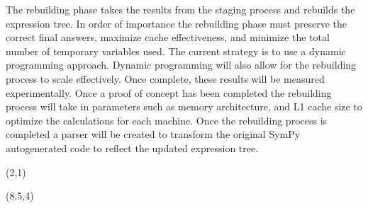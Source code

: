 \documentclass[landscape]{a0poster}
\def\Subhead#1{\noindent{\textbf{\Large\color{DarkBlue} #1}}\medskip}
\begin{document}
\begin{textblock}{30}
\begin{textblock}{14}
	\vspace{-0.25in}
	The rebuilding phase takes the results from the staging process and rebuilds the expression tree. In order of importance the rebuilding phase must preserve the correct final answers, maximize cache effectiveness, and minimize the total number of temporary variables used. The current strategy is to use a dynamic programming approach. Dynamic programming will also allow for the rebuilding process to scale effectively. Once complete, these results will be measured experimentally. Once a proof of concept has been completed the rebuilding process will take in parameters such as memory architecture, and L1 cache size to optimize the calculations for each machine. Once the rebuilding process is completed a parser will be created to transform the original SymPy autogenerated code to reflect the updated expression tree.
	\begin{textblock}{12}(2,1)
	\end{textblock}	
\end{textblock}
	

\begin{textblock}{8}(8.5,4)

\end{textblock}






\end{textblock}
\end{document}
